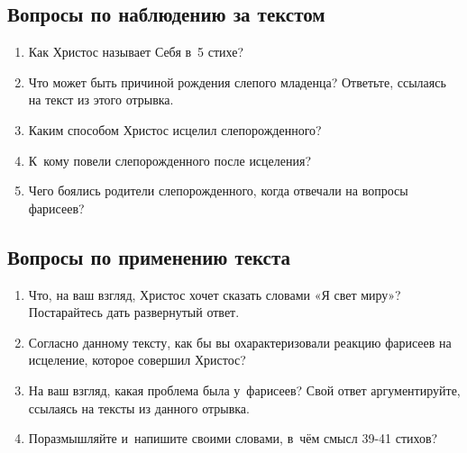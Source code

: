 \documentclass[a4paper,12pt]{article}
\begin{document}
\subsection*{Вопросы по наблюдению за текстом}
\begin{enumerate}
    \item Как Христос называет Себя в~5 стихе? 
    
    \myline
    
    \item Что может быть причиной рождения слепого младенца? Ответьте, ссылаясь на текст из этого отрывка. 
    
    \myline
    
    \myline
    \item Каким способом Христос исцелил слепорожденного? 
    
    \myline
    
    \myline
    \item К~кому повели слепорожденного после исцеления? 
    
    \myline
    
    \myline
    \item Чего боялись родители слепорожденного, когда отвечали на вопросы фарисеев? 
    
    \myline
    
    \myline
\end{enumerate}

\subsection*{Вопросы по применению текста} 
\begin{enumerate}
    \item Что, на ваш взгляд, Христос хочет сказать словами «Я свет миру»? Постарайтесь дать развернутый ответ.
    
    \myline
    
    \myline
    \item Согласно данному тексту, как бы вы охарактеризовали реакцию фарисеев на исцеление, которое совершил Христос? 
    
    \myline
    
    \myline
    \item На ваш взгляд, какая проблема была у~фарисеев? Свой ответ аргументируйте, ссылаясь на тексты из данного отрывка. 
    
    \myline
    
    \myline
    \item Поразмышляйте и~напишите своими словами, в~чём смысл 39-41 стихов?
    
    \myline
    
    \myline
\end{enumerate}
\end{document}
